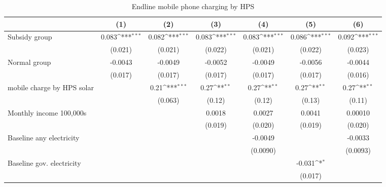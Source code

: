 \begin{table}[htbp]\centering
\def\sym#1{\ifmmode^{#1}\else\(^{#1}\)\fi}
\caption{Endline mobile phone charging by HPS}
\begin{tabular*}{1\hsize}{@{\hskip\tabcolsep\extracolsep\fill}l*{6}{c}}
\toprule
                &\multicolumn{1}{c}{(1)}         &\multicolumn{1}{c}{(2)}         &\multicolumn{1}{c}{(3)}         &\multicolumn{1}{c}{(4)}         &\multicolumn{1}{c}{(5)}         &\multicolumn{1}{c}{(6)}         \\
\midrule
Subsidy group   &    0.083\sym{***}&    0.082\sym{***}&    0.083\sym{***}&    0.083\sym{***}&    0.086\sym{***}&    0.092\sym{***}\\
                &  (0.021)         &  (0.021)         &  (0.022)         &  (0.021)         &  (0.022)         &  (0.023)         \\
Normal group    &  -0.0043         &  -0.0049         &  -0.0052         &  -0.0049         &  -0.0056         &  -0.0044         \\
                &  (0.017)         &  (0.017)         &  (0.017)         &  (0.017)         &  (0.017)         &  (0.016)         \\
mobile charge by HPS solar&                  &     0.21\sym{***}&     0.27\sym{**} &     0.27\sym{**} &     0.27\sym{**} &     0.27\sym{**} \\
                &                  &  (0.063)         &   (0.12)         &   (0.12)         &   (0.13)         &   (0.11)         \\
Monthly income 100,000s&                  &                  &   0.0018         &   0.0027         &   0.0041         &  0.00010         \\
                &                  &                  &  (0.019)         &  (0.020)         &  (0.019)         &  (0.020)         \\
Baseline any electricity&                  &                  &                  &  -0.0049         &                  &  -0.0033         \\
                &                  &                  &                  & (0.0090)         &                  & (0.0093)         \\
Baseline gov. electricity&                  &                  &                  &                  &   -0.031\sym{*}  &                  \\
                &                  &                  &                  &                  &  (0.017)         &                  \\

\end{tabular*}
\end{table}
